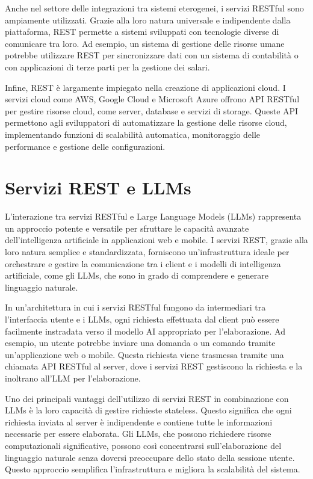 \documentclass[a4paper,twoside,12pt]{toptesi}
\begin{document}
Anche nel settore delle integrazioni tra sistemi eterogenei, i servizi RESTful sono ampiamente utilizzati. Grazie alla loro natura universale e indipendente dalla piattaforma, REST permette a sistemi sviluppati con tecnologie diverse di comunicare tra loro. Ad esempio, un sistema di gestione delle risorse umane potrebbe utilizzare REST per sincronizzare dati con un sistema di contabilità o con applicazioni di terze parti per la gestione dei salari.

Infine, REST è largamente impiegato nella creazione di applicazioni cloud. I servizi cloud come AWS, Google Cloud e Microsoft Azure offrono API RESTful per gestire risorse cloud, come server, database e servizi di storage. Queste API permettono agli sviluppatori di automatizzare la gestione delle risorse cloud, implementando funzioni di scalabilità automatica, monitoraggio delle performance e gestione delle configurazioni.

\section{Servizi REST e LLMs}

L'interazione tra servizi RESTful e Large Language Models (LLMs) rappresenta un approccio potente e versatile per sfruttare le capacità avanzate dell'intelligenza artificiale in applicazioni web e mobile. I servizi REST, grazie alla loro natura semplice e standardizzata, forniscono un'infrastruttura ideale per orchestrare e gestire la comunicazione tra i client e i modelli di intelligenza artificiale, come gli LLMs, che sono in grado di comprendere e generare linguaggio naturale.

In un'architettura in cui i servizi RESTful fungono da intermediari tra l'interfaccia utente e i LLMs, ogni richiesta effettuata dal client può essere facilmente instradata verso il modello AI appropriato per l'elaborazione. Ad esempio, un utente potrebbe inviare una domanda o un comando tramite un'applicazione web o mobile. Questa richiesta viene trasmessa tramite una chiamata API RESTful al server, dove i servizi REST gestiscono la richiesta e la inoltrano all'LLM per l'elaborazione.

Uno dei principali vantaggi dell'utilizzo di servizi REST in combinazione con LLMs è la loro capacità di gestire richieste stateless. Questo significa che ogni richiesta inviata al server è indipendente e contiene tutte le informazioni necessarie per essere elaborata. Gli LLMs, che possono richiedere risorse computazionali significative, possono così concentrarsi sull'elaborazione del linguaggio naturale senza doversi preoccupare dello stato della sessione utente. Questo approccio semplifica l'infrastruttura e migliora la scalabilità del sistema.
\end{document}
